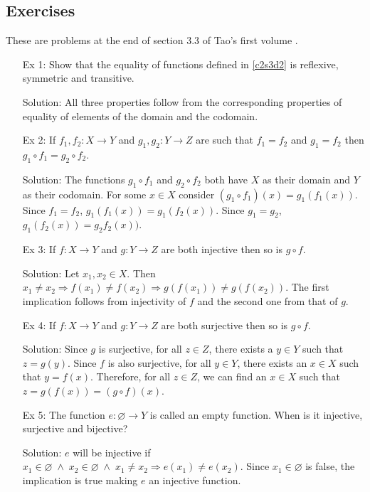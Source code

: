 \subsection{Exercises}
These are problems at the end of section 3.3 of Tao's first volume
\cite{tao2014a1}.
\begin{enumerate}
\item[Ex 1:] Show that the equality of functions defined in \ref{c2s3d2}
is reflexive, symmetric and transitive.
\item[Solution:] All three properties follow from the corresponding 
properties of equality of elements of the domain and the codomain.

\item[Ex 2:] If $f_1, f_2: X \rightarrow Y$ and $g_1, g_2: Y \rightarrow
Z$ are such that $f_1 = f_2$ and $g_1 = f_2$ then $g_1 \circ f_1 = g_2
\circ f_2$.
\item[Solution:] The functions $g_1 \circ f_1$ and $g_2 \circ f_2$ both
have $X$ as their domain and $Y$ as their codomain. For some $x \in X$
consider $(g_1 \circ f_1)(x) = g_1(f_1(x))$. Since $f_1 = f_2$, 
$g_1(f_1(x)) = g_1(f_2(x))$. Since $g_1 = g_2$, $g_1(f_2(x)) = g_2f_2(x))$.

\item[Ex 3:] If $f: X \rightarrow Y$ and $g: Y \rightarrow Z$ are both
injective then so is $g \circ f$.
\item[Solution:] Let $x_1, x_2 \in X$. Then $x_1 \ne x_2 \Rightarrow
f(x_1) \ne f(x_2) \Rightarrow g(f(x_1)) \ne g(f(x_2))$. The first 
implication follows from injectivity of $f$ and the second one from that of
$g$.

\item[Ex 4:] If $f: X \rightarrow Y$ and $g: Y \rightarrow Z$ are both
surjective then so is $g \circ f$.
\item[Solution:] Since $g$ is surjective, for all $z \in Z$, there exists
a $y \in Y$ such that $z = g(y)$. Since $f$ is also surjective, for all $y
\in Y$, there exists an $x \in X$ such that $y = f(x)$. Therefore, for all
$z \in Z$, we can find an $x \in X$ such that $z = g(f(x)) = (g \circ f)(x)
$.

\item[Ex 5:] The function $e: \varnothing \rightarrow Y$ is called an
empty function. When is it injective, surjective and bijective?
\item[Solution:] $e$ will be injective if $x_1 \in \varnothing \;\land\;
x_2 \in \varnothing \;\land\; x_1 \ne x_2 \Rightarrow e(x_1)
\ne e(x_2)$. Since $x_1 \in \varnothing$ is false, the implication is true
making $e$ an injective function.


\end{enumerate}
